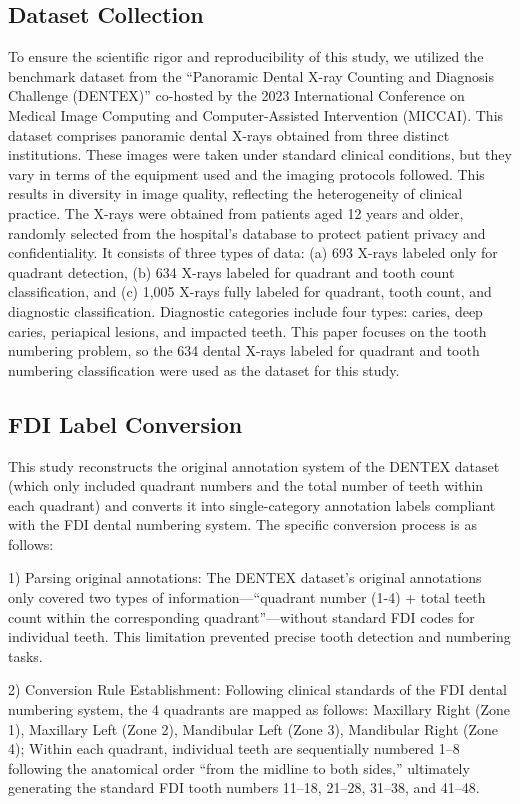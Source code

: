 \documentclass[pdflatex,sn-mathphys-num]{sn-jnl}%
\theoremstyle{thmstyleone}%
\theoremstyle{thmstyletwo}%
\theoremstyle{thmstylethree}%
\begin{document}
\subsection{Dataset Collection}

To ensure the scientific rigor and reproducibility of this study, we utilized the benchmark dataset from the “Panoramic Dental X-ray Counting and Diagnosis Challenge (DENTEX)” co-hosted by the 2023 International Conference on Medical Image Computing and Computer-Assisted Intervention (MICCAI). This dataset comprises panoramic dental X-rays obtained from three distinct institutions. These images were taken under standard clinical conditions, but they vary in terms of the equipment used and the imaging protocols followed. This results in diversity in image quality, reflecting the heterogeneity of clinical practice. The X-rays were obtained from patients aged 12 years and older, randomly selected from the hospital's database to protect patient privacy and confidentiality. It consists of three types of data: (a) 693 X-rays labeled only for quadrant detection, (b) 634 X-rays labeled for quadrant and tooth count classification, and (c) 1,005 X-rays fully labeled for quadrant, tooth count, and diagnostic classification. Diagnostic categories include four types: caries, deep caries, periapical lesions, and impacted teeth. This paper focuses on the tooth numbering problem, so the 634 dental X-rays labeled for quadrant and tooth numbering classification were used as the dataset for this study. 

\subsection{FDI Label Conversion}

This study reconstructs the original annotation system of the DENTEX dataset (which only included quadrant numbers and the total number of teeth within each quadrant) and converts it into single-category annotation labels compliant with the FDI dental numbering system. The specific conversion process is as follows:

1) Parsing original annotations: The DENTEX dataset's original annotations only covered two types of information—“quadrant number (1-4) + total teeth count within the corresponding quadrant”—without standard FDI codes for individual teeth. This limitation prevented precise tooth detection and numbering tasks. 

2) Conversion Rule Establishment: Following clinical standards of the FDI dental numbering system, the 4 quadrants are mapped as follows: Maxillary Right (Zone 1), Maxillary Left (Zone 2), Mandibular Left (Zone 3), Mandibular Right (Zone 4); Within each quadrant, individual teeth are sequentially numbered 1–8 following the anatomical order “from the midline to both sides,” ultimately generating the standard FDI tooth numbers 11–18, 21–28, 31–38, and 41–48. 
\end{document}
